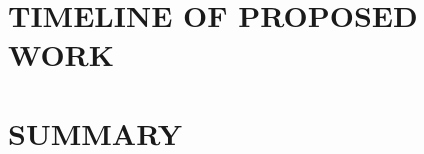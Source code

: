 \documentclass[driverfallback=dvipdfmx,final]{pittetd}
\begin{document}
\chapter{TIMELINE OF PROPOSED WORK}
\label{chapter:timeline}


\chapter{SUMMARY}
\label{chapter:summary}


\appendix                      
%

\begin{singlespace}

{
\footnotesize

}
\end{singlespace}
\end{document}
